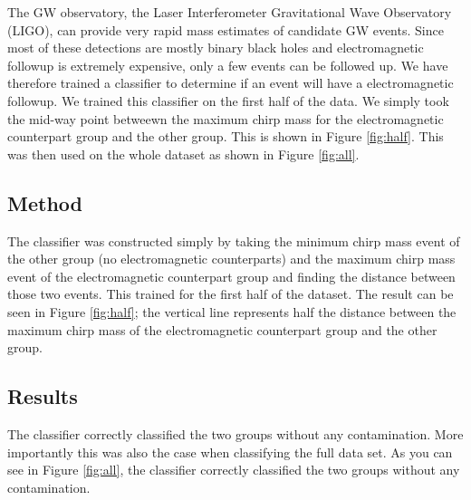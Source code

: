 The GW observatory, the Laser Interferometer Gravitational Wave Observatory (LIGO), can provide very rapid mass estimates of candidate GW events. Since most of these detections are mostly binary black holes and electromagnetic followup is extremely expensive, only a few events can be followed up. We have therefore trained a classifier to determine if an event will have a electromagnetic followup. We trained this classifier on the first half of the data. We simply took the mid-way point betweewn the maximum chirp mass for the electromagnetic counterpart group and the other group. This is shown in Figure \ref{fig:half}. This was then used on the whole dataset as shown in Figure \ref{fig:all}.

\subsection{Method}
The classifier was constructed simply by taking the minimum chirp mass event of the other group (no electromagnetic counterparts) and the maximum chirp mass event of the electromagnetic counterpart group and finding the distance between those two events. This trained for the first half of the dataset. The result can be seen in Figure \ref{fig:half}; the vertical line represents half the distance between the maximum chirp mass of the electromagnetic counterpart group and the other group.

\subsection{Results}
The classifier correctly classified the two groups without any contamination. More importantly this was also the case when classifying the full data set. As you can see in Figure \ref{fig:all}, the classifier correctly classified the two groups without any contamination.